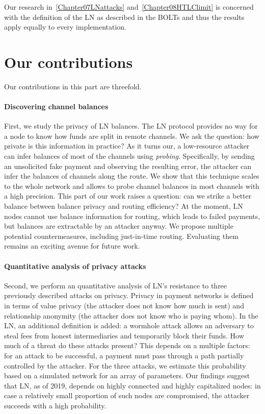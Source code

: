 Our research in~\cref{Chapter07LNattacks} and~\cref{Chapter08HTLClimit} is concerned with the definition of the LN as described in the BOLTs and thus the results apply equally to every implementation.


\section{Our contributions}
Our contributions in this part are threefold.

\paragraph{Discovering channel balances}
First, we study the privacy of LN balances.
The LN protocol provides no way for a node to know how funds are split in remote channels.
We ask the question: how private is this information in practice?
As it turns our, a low-resource attacker can infer balances of most of the channels using \textit{probing}.
Specifically, by sending an unsolicited fake payment and observing the resulting error, the attacker can infer the balances of channels along the route.
We show that this technique scales to the whole network and allows to probe channel balances in most channels with a high precision.
This part of our work raises a question: can we strike a better balance between balance privacy and routing efficiency?
At the moment, LN nodes cannot use balance information for routing, which leads to failed payments, but balances are extractable by an attacker anyway.
We propose multiple potential countermeasures, including just-in-time routing.
Evaluating them remains an exciting avenue for future work.

\paragraph{Quantitative analysis of privacy attacks}
Second, we perform an quantitative analysis of LN's resistance to three previously described attacks on privacy.
Privacy in payment networks is defined in terms of value privacy (the attacker does not know how much is sent) and relationship anonymity (the attacker does not know who is paying whom).
In the LN, an additional definition is added: a wormhole attack allows an adversary to steal fees from honest intermediaries and temporarily block their funds.
How much of a threat do these attacks present?
This depends on a multiple factors: for an attack to be successful, a payment must pass through a path partially controlled by the attacker.
For the three attacks, we estimate this probability based on a simulated network for an array of parameters.
Our findings suggest that LN, as of 2019, depends on highly connected and highly capitalized nodes: in case a relatively small proportion of such nodes are compromised, the attacker succeeds with a high probability.


